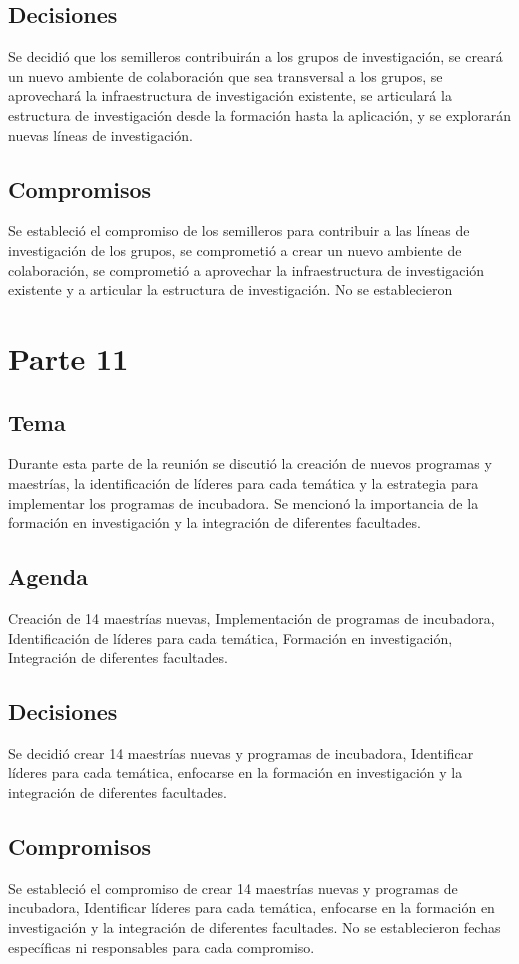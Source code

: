 \documentclass{article}
\begin{document}
\subsection{Decisiones}
Se decidió que los semilleros contribuirán a los grupos de investigación, se creará un nuevo ambiente de colaboración que sea transversal a los grupos, se aprovechará la infraestructura de investigación existente, se articulará la estructura de investigación desde la formación hasta la aplicación, y se explorarán nuevas líneas de investigación.

\subsection{Compromisos}
Se estableció el compromiso de los semilleros para contribuir a las líneas de investigación de los grupos, se comprometió a crear un nuevo ambiente de colaboración, se comprometió a aprovechar la infraestructura de investigación existente y a articular la estructura de investigación. No se establecieron
\section{Parte 11}
\subsection{Tema}
Durante esta parte de la reunión se discutió la creación de nuevos programas y maestrías, la identificación de líderes para cada temática y la estrategia para implementar los programas de incubadora. Se mencionó la importancia de la formación en investigación y la integración de diferentes facultades.

\subsection{Agenda}
Creación de 14 maestrías nuevas, Implementación de programas de incubadora, Identificación de líderes para cada temática, Formación en investigación, Integración de diferentes facultades.

\subsection{Decisiones}
Se decidió crear 14 maestrías nuevas y programas de incubadora, Identificar líderes para cada temática, enfocarse en la formación en investigación y la integración de diferentes facultades.

\subsection{Compromisos}
Se estableció el compromiso de crear 14 maestrías nuevas y programas de incubadora, Identificar líderes para cada temática, enfocarse en la formación en investigación y la integración de diferentes facultades. No se establecieron fechas específicas ni responsables para cada compromiso.
\end{document}
